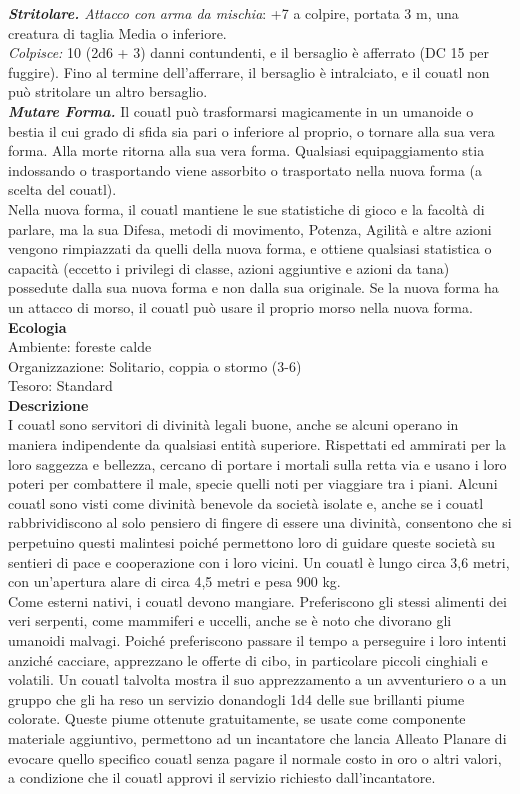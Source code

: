 \begin{multicols}{2}
\emph{\textbf{Stritolare.} Attacco con arma da mischia}: +7 a colpire, portata 3 m, una creatura di taglia Media o inferiore.\\
\emph{Colpisce:} 10 (2d6 + 3) danni contundenti, e il bersaglio è afferrato (DC 15 per fuggire). Fino al termine dell'afferrare, il bersaglio è intralciato, e il couatl non può stritolare un altro bersaglio.\\
\emph{\textbf{Mutare Forma.}} Il couatl può trasformarsi magicamente in un umanoide o bestia il cui grado di sfida sia pari o inferiore al proprio, o tornare alla sua vera forma. Alla morte ritorna alla sua vera forma. Qualsiasi equipaggiamento stia indossando o trasportando viene assorbito o trasportato nella nuova forma (a scelta del couatl).\\
Nella nuova forma, il couatl mantiene le sue statistiche di gioco e la facoltà di parlare, ma la sua Difesa, metodi di movimento, Potenza, Agilità e altre azioni vengono rimpiazzati da quelli della nuova forma, e ottiene qualsiasi statistica o capacità (eccetto i privilegi di classe, azioni aggiuntive e azioni da tana) possedute dalla sua nuova forma e non dalla sua originale. Se la nuova forma ha un attacco di morso, il couatl può usare il proprio morso nella nuova forma.\\
\textbf{Ecologia}\\
Ambiente: foreste calde\\
Organizzazione: Solitario, coppia o stormo (3-6)\\
Tesoro: Standard\\
\textbf{Descrizione}\\
I couatl sono servitori di divinità legali buone, anche se alcuni operano in maniera indipendente da qualsiasi entità superiore. Rispettati ed ammirati per la loro saggezza e bellezza, cercano di portare i mortali sulla retta via e usano i loro poteri per combattere il male, specie quelli noti per viaggiare tra i piani. Alcuni couatl sono visti come divinità benevole da società isolate e, anche se i couatl rabbrividiscono al solo pensiero di fingere di essere una divinità, consentono che si perpetuino questi malintesi poiché permettono loro di guidare queste società su sentieri di pace e cooperazione con i loro vicini. Un couatl è lungo circa 3,6 metri, con un’apertura alare di circa 4,5 metri e pesa 900 kg.\\
Come esterni nativi, i couatl devono mangiare. Preferiscono gli stessi alimenti dei veri serpenti, come mammiferi e uccelli, anche se è noto che divorano gli umanoidi malvagi. Poiché preferiscono passare il tempo a perseguire i loro intenti anziché cacciare, apprezzano le offerte di cibo, in particolare piccoli cinghiali e volatili. Un couatl talvolta mostra il suo apprezzamento a un avventuriero o a un gruppo che gli ha reso un servizio donandogli 1d4 delle sue brillanti piume colorate. Queste piume ottenute gratuitamente, se usate come componente materiale aggiuntivo, permettono ad un incantatore che lancia Alleato Planare di evocare quello specifico couatl senza pagare il normale costo in oro o altri valori, a condizione che il couatl approvi il servizio richiesto dall’incantatore.\\


\end{multicols}
